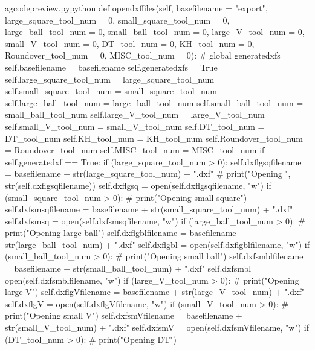\documentclass{ltxdoc}
\begin{document}
\begin{writecode}{a}{gcodepreview.py}{python}
    def opendxffiles(self, basefilename = "export", 
                     large_square_tool_num = 0, 
                     small_square_tool_num = 0, 
                     large_ball_tool_num = 0,
                     small_ball_tool_num = 0,
                     large_V_tool_num = 0,
                     small_V_tool_num = 0,
                     DT_tool_num = 0,
                     KH_tool_num = 0,
                     Roundover_tool_num = 0,
                     MISC_tool_num = 0):
#        global generatedxfs
        self.basefilename = basefilename
        self.generatedxfs = True
        self.large_square_tool_num = large_square_tool_num 
        self.small_square_tool_num = small_square_tool_num
        self.large_ball_tool_num = large_ball_tool_num
        self.small_ball_tool_num = small_ball_tool_num
        self.large_V_tool_num = large_V_tool_num
        self.small_V_tool_num = small_V_tool_num
        self.DT_tool_num = DT_tool_num
        self.KH_tool_num = KH_tool_num
        self.Roundover_tool_num = Roundover_tool_num
        self.MISC_tool_num = MISC_tool_num
        if self.generatedxf == True:
            if (large_square_tool_num > 0):
                self.dxflgsqfilename = basefilename + str(large_square_tool_num) + ".dxf"
#                print("Opening ", str(self.dxflgsqfilename))
                self.dxflgsq = open(self.dxflgsqfilename, "w")
            if (small_square_tool_num > 0):
#                print("Opening small square")
                self.dxfsmsqfilename = basefilename + str(small_square_tool_num) + ".dxf"
                self.dxfsmsq = open(self.dxfsmsqfilename, "w")
            if (large_ball_tool_num > 0):
#                print("Opening large ball")
                self.dxflgblfilename = basefilename + str(large_ball_tool_num) + ".dxf"
                self.dxflgbl = open(self.dxflgblfilename, "w")
            if (small_ball_tool_num > 0):
#                print("Opening small ball")
                self.dxfsmblfilename = basefilename + str(small_ball_tool_num) + ".dxf"
                self.dxfsmbl = open(self.dxfsmblfilename, "w")
            if (large_V_tool_num > 0):
#                print("Opening large V")
                self.dxflgVfilename = basefilename + str(large_V_tool_num) + ".dxf"
                self.dxflgV = open(self.dxflgVfilename, "w")
            if (small_V_tool_num > 0):
#                print("Opening small V")
                self.dxfsmVfilename = basefilename + str(small_V_tool_num) + ".dxf"
                self.dxfsmV = open(self.dxfsmVfilename, "w")
            if (DT_tool_num > 0):
#                print("Opening DT")

\end{writecode}
\end{document}
